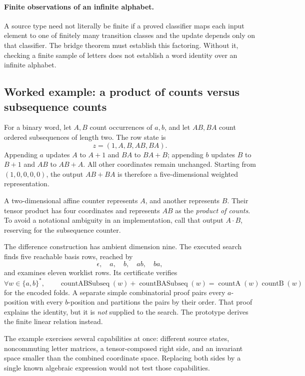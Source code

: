 \paragraph{Finite observations of an infinite alphabet.}
A source type need not literally be finite if a proved classifier maps each
input element to one of finitely many transition classes and the update depends
only on that classifier. The bridge theorem must establish this factoring.
Without it, checking a finite sample of letters does not establish a word
identity over an infinite alphabet.

\subsection{Worked example: a product of counts versus subsequence counts}

For a binary word, let $A,B$ count occurrences of $a,b$, and let $AB,BA$ count
ordered subsequences of length two. The row state is
\[
 z=(1,A,B,AB,BA).
\]
Appending $a$ updates $A$ to $A+1$ and $BA$ to $BA+B$; appending $b$ updates $B$
to $B+1$ and $AB$ to $AB+A$. All other coordinates remain unchanged. Starting
from $(1,0,0,0,0)$, the output $AB+BA$ is therefore a five-dimensional weighted
representation.

A two-dimensional affine counter represents $A$, and another represents $B$.
Their tensor product has four coordinates and represents $AB$ as the
\emph{product of counts}. To avoid a notational ambiguity in an implementation,
call that output $A\cdot B$, reserving  for the subsequence
counter.

The difference construction has ambient dimension nine. The executed search
finds five reachable basis rows, reached by
\[
 \epsilon,\quad a,\quad b,\quad ab,\quad ba,
\]
and examines eleven worklist rows. Its certificate verifies
\[
 \forall w\in\{a,b\}^*,\qquad
 \operatorname{countABSubseq}(w)+\operatorname{countBASubseq}(w)
 =\operatorname{countA}(w)\operatorname{countB}(w)
\]
for the encoded folds. A separate simple combinatorial proof pairs every
$a$-position with every $b$-position and partitions the pairs by their order.
That proof explains the identity, but it is \emph{not} supplied to the search.
The prototype derives the finite linear relation instead.

The example exercises several capabilities at once: different source states,
noncommuting letter matrices, a tensor-composed right side, and an invariant
space smaller than the combined coordinate space. Replacing both sides by a
single known algebraic expression would not test those capabilities.

